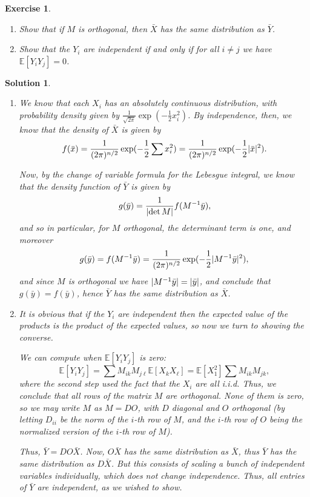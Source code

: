 \documentclass{article}
\newtheorem{ex}{Exercise}
\theoremstyle{nonumberplain}
\newtheorem{sol}{Solution}
\DeclarePairedDelimiter{\abs}{\lvert}{\rvert}
\newcommand{\EV}{\mathbb{E}}
\begin{document}
\begin{ex}
\leavevmode
\begin{enumerate}
\item Show that if $M$ is orthogonal, then $\bar X$ has the same distribution as $\bar Y$.
\item Show that the $Y_i$ are independent if and only if for all $i \neq j$ we have $\EV[Y_i Y_j] = 0$.
\end{enumerate}
\end{ex}

\begin{sol}
\leavevmode
\begin{enumerate}
\item We know that each $X_i$ has an absolutely continuous distribution, with probability density given by $\frac1{\sqrt{2\pi}} \exp(-\frac12 x_i^2)$. By independence, then, we know that the density of $\bar X$ is given by
\begin{equation}
f(\bar x) = \frac1{(2\pi)^{n/2}} \exp(-\frac12 \sum x_i^2) = \frac1{(2\pi)^{n/2}} \exp(-\frac12 \abs{\bar x}^2).
\end{equation}

Now, by the change of variable formula for the Lebesgue integral, we know that the density function of $\bar Y$ is given by
\begin{equation}
g(\bar y) = \frac1{\abs{\det M}} f(M^{-1} \bar y),
\end{equation}
and so in particular, for $M$ orthogonal, the determinant term is one, and moreover
\begin{equation}
g(\bar y) = f(M^{-1} \bar y) = \frac1{(2\pi)^{n/2}} \exp(-\frac12 \abs{M^{-1} \bar y}^2),
\end{equation}
and since $M$ is orthogonal we have $\abs{M^{-1} \bar y} = \abs{\bar y}$, and conclude that $g(\bar y) = f(\bar y)$, hence $\bar Y$ has the same distribution as $\bar X$.

\item It is obvious that if the $Y_i$ are independent then the expected value of the products is the product of the expected values, so now we turn to showing the converse.

We can compute when $\EV[Y_i Y_j]$ is zero:
\begin{equation}
\EV[Y_i Y_j] = \sum M_{ik} M_{j\ell} \EV[X_k X_\ell] = \EV[X_1^2] \sum M_{ik} M_{jk},
\end{equation}
where the second step used the fact that the $X_i$ are all i.i.d. Thus, we conclude that all rows of the matrix $M$ are orthogonal. None of them is zero, so we may write $M$ as $M = D O$, with $D$ diagonal and $O$ orthogonal (by letting $D_{ii}$ be the norm of the $i$-th row of $M$, and the $i$-th row of $O$ being the normalized version of the $i$-th row of $M$).

Thus, $\bar Y = D O \bar X$. Now, $O \bar X$ has the same distribution as $\bar X$, thus $\bar Y$ has the same distribution as $D \bar X$. But this consists of scaling a bunch of independent variables individually, which does not change independence. Thus, all entries of $\bar Y$ are independent, as we wished to show.
\end{enumerate}
\end{sol}
\end{document}
